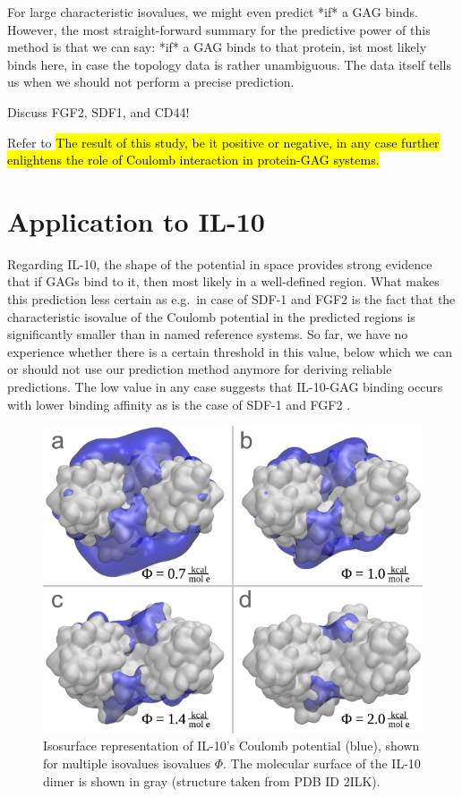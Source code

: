 For large characteristic isovalues, we might even predict *if* a GAG binds.
However, the most straight-forward summary for the predictive power of this
method is that we can say: *if* a GAG binds to that protein, ist most likely
binds here, in case the topology data is rather unambiguous. The data itself
tells us when we should not perform a precise prediction.


Discuss FGF2, SDF1, and CD44!

Refer to \hl{The result of this study, be it positive or negative, in any case
further enlightens the role of Coulomb interaction in protein-GAG systems.}

\section{Application to IL-10}

Regarding IL-10, the shape of the potential in space provides strong evidence
that if GAGs bind to it, then most likely in a well-defined region. What makes
this prediction less certain as e.g.\ in case of SDF-1 and FGF2 is the fact that
the characteristic isovalue of the Coulomb potential in the predicted regions is
significantly smaller than in named reference systems. So far, we have no
experience whether there is a certain threshold in this value, below which we
can or should not use our prediction method anymore for deriving reliable
predictions. The low value in any case suggests that IL-10-GAG binding occurs
with lower binding affinity as is the case of  SDF-1 and FGF2 .

\begin{figure}
\centering
\includegraphics[width=1.0\textwidth]{gfx/bspred/il10_top_coulomb_isosurfaces_different_values_03_ds.pdf}
\caption[]{
Isosurface representation of IL-10's Coulomb potential (blue), shown for
multiple isovalues isovalues $\Phi$. The molecular surface of the IL-10 dimer is
shown in gray (structure taken from PDB ID 2ILK).
}
\label{fig:bspred:il10_multi_iso}
\end{figure}


